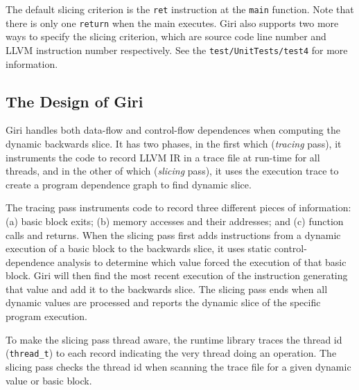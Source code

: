 \documentclass[DIV=calc, paper=a4, fontsize=11pt, twocolumn]{scrartcl}
\begin{document}
The default slicing criterion is the \texttt{ret} instruction at the \texttt{main} function.
Note that there is only one \texttt{return} when the main executes.
Giri also supports two more ways to specify the slicing criterion, which are source code line number and LLVM instruction number respectively.
See the \texttt{test/UnitTests/test4} for more information.

\subsection{The Design of Giri}
Giri handles both data-flow and control-flow dependences when computing the dynamic backwards slice. 
It has two phases, in the first which (\emph{tracing} pass), it instruments the code to record LLVM IR in a trace file at run-time for all threads,
and in the other of which (\emph{slicing} pass), it uses the execution trace to create a program dependence graph to find dynamic slice.

The tracing pass instruments code to record three different pieces of information:
(a) basic block exits; (b) memory accesses and their addresses; and (c) function calls and returns.
When the slicing pass first adds instructions from a dynamic execution of a basic block to the backwards slice,
it uses static control-dependence analysis to determine which value forced the execution of that basic block.
Giri will then find the most recent execution of the instruction generating that value and add it to the backwards slice.
The slicing pass ends when all dynamic values are processed and reports the dynamic slice of the specific program execution.

To make the slicing pass thread aware, the runtime library traces the thread id (\texttt{thread\_t}) to each record indicating the very thread doing an operation.
The slicing pass checks the thread id when scanning the trace file for a given dynamic value or basic block.

\end{document}
